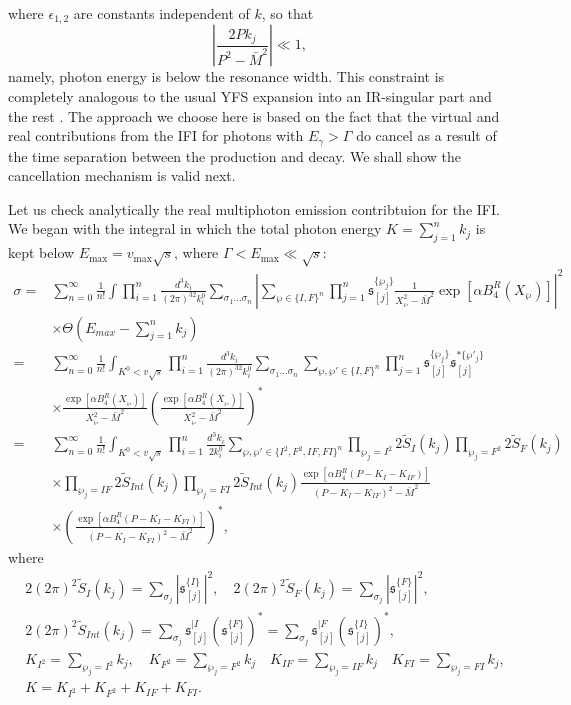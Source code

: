 where $\epsilon_{1,2}$ are constants independent of $k$, so that
\begin{equation*}
\left| \frac{2Pk_j}{P^2-\bar{M}^2}\right|\ll 1,
\end{equation*}
namely, photon energy is below the resonance width. This constraint is completely analogous to the usual YFS expansion into an IR-singular part and the rest \cite{YFS}. The approach we choose here is based on the fact that the virtual and real contributions from the IFI for photons with $E_\gamma>\Gamma$ do cancel as a result of the time separation between the production and decay. We shall show the cancellation mechanism is valid next. 

Let us check analytically the real multiphoton emission contribtuion for the IFI. We began with the integral in which the total photon energy $K=\sum_{j=1}^{n}k_j$ is kept below $E_\text{max}=v_\text{max}\sqrt{s}$, where $\Gamma<E_\text{max}\ll\sqrt{s}$:
\begin{align}
\sigma=&\sum_{n=0}^{\infty}\frac{1}{n!}\int\prod_{i=1}^{n}\frac{d^3k_i}{(2\pi)^32k_i^0}\sum_{\sigma_1\ldots\sigma_n}\left| \sum_{\wp\in\{I,F\}^n}\prod_{j=1}^{n}\mathfrak{s}_{[j]}^{\{\wp_j\}}\frac{1}{X^2_\wp-\bar{M}^2}\exp[\alpha B^R_4(X_\wp)] \right|^2\nonumber\\
&\times\Theta\left(E_{max}-\sum_{j=1}^{n}k_j\right)\nonumber\\
=&\sum_{n=0}^{\infty}\frac{1}{n!}\int_{K^0<v\sqrt{s}}\prod_{i=1}^{n}\frac{d^3k_i}{(2\pi)^32k^0_i}\sum_{\sigma_1\ldots\sigma_n}\sum_{\wp,\wp'\in\{I,F\}^n}\prod_{j=1}^{n}\mathfrak{s}_{[j]}^{\{\wp_j\}}\mathfrak{s}_{[j]}^{\ast\{\wp'_j\}}\nonumber\\
&\times\frac{\exp[\alpha B^R_4(X_\wp)]}{X_\wp^2-\bar{M}^2}\left(\frac{\exp[\alpha B^R_4(X_\wp)]}{X_\wp^2-\bar{M}^2}\right)^\ast\nonumber\\
=&\sum_{n=0}^{\infty}\frac{1}{n!}\int_{K^0<v\sqrt{s}}\prod_{i=1}^{n}\frac{d^3k_i}{2k^0_i}\sum_{\wp,\wp'\in\{I^2,F^2,IF,FI\}^n}\prod_{\wp_j=I^2}2\widetilde{S}_I(k_j)\prod_{\wp_j=F^2}2\widetilde{S}_F(k_j)\nonumber\\
&\times\prod_{\wp_j=IF}2\widetilde{S}_{Int}(k_j)\prod_{\wp_j=FI}2\widetilde{S}_{Int}(k_j)\frac{\exp[\alpha B_4^R(P-K_I-K_{IF})]}{(P-K_I-K_{IF})^2-\bar{M}^2}\nonumber\\
&\times\left( \frac{\exp[\alpha B_4^R(P-K_I-K_{FI})]}{(P-K_I-K_{FI})^2-\bar{M}^2} \right)^\ast,
\end{align}
where
\begin{align}
&2(2\pi)^2\widetilde{S}_I(k_j)=\sum_{\sigma_j}\left|\mathfrak{s}^{\{I\}}_{[j]}\right|^2,\quad 2(2\pi)^2\widetilde{S}_F(k_j)=\sum_{\sigma_j}\left|\mathfrak{s}^{\{F\}}_{[j]}\right|^2,\nonumber\\
&2(2\pi)^2\widetilde{S}_{Int}(k_j)=\sum_{\sigma_j}\mathfrak{s}^{|{I}}_{[j]}\left(\mathfrak{s}^{\{F\}}_{[j]}\right)^\ast=\sum_{\sigma_j}\mathfrak{s}^{|{F}}_{[j]}\left(\mathfrak{s}^{\{I\}}_{[j]}\right)^\ast,\nonumber\\
&K_{I^2}=\sum_{\wp_j=I^2} k_j,\quad K_{F^2}=\sum_{\wp_j=F^2} k_j\quad K_{IF}=\sum_{\wp_j=IF} k_j\quad K_{FI}=\sum_{\wp_j=FI} k_j,\nonumber\\
&K=K_{I^2}+K_{F^2}+K_{IF}+K_{FI}.
\end{align}
